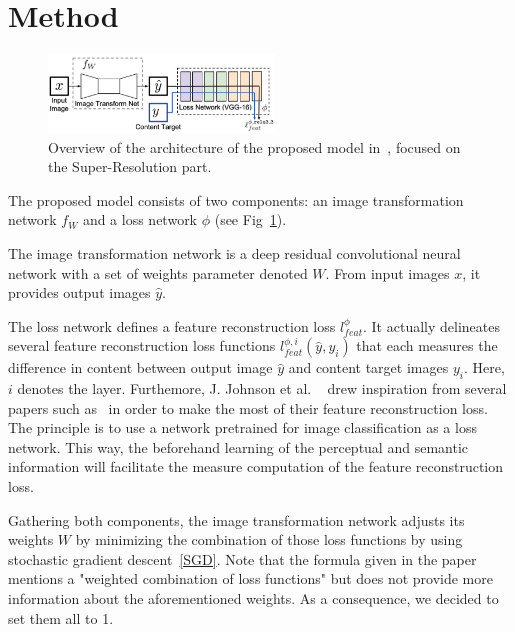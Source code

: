 \documentclass{article}
\begin{document}
{
    \section{Method}
    \label{sec:method}

        \begin{figure}[ht]
            \centering
            \includegraphics[width=6cm]{images/model.png}
            \caption{Overview of the architecture of the proposed model in~\cite{https://doi.org/10.48550/arxiv.1603.08155}, focused on the Super-Resolution part.}
            \label{fig:model}
        \end{figure}


        The proposed model consists of two components: an image transformation network $f_W$ and a loss network $\phi$ (see Fig~\ref{fig:model}). 
        
        The image transformation network is a deep residual convolutional neural network with a set of weights parameter denoted $W$. From input images $x$, it provides output images $\hat y$. 
        
        The loss network defines a feature reconstruction loss $l^\phi_{feat}$. It actually delineates several feature reconstruction loss functions $l^{\phi, i}_{feat}(\hat y, y_i)$ that each measures the difference in content between output image $\hat y$ and content target images $y_i$. Here, $i$ denotes the layer.
        Furthemore, J. Johnson et al. ~\cite{https://doi.org/10.48550/arxiv.1603.08155} drew inspiration from several papers such as~\cite{gatys} in order to make the most of their feature reconstruction loss. The principle is to use a network pretrained for image classification as a loss network. This way, the beforehand learning of the perceptual and semantic information will facilitate the measure computation of the feature reconstruction loss. 

        \bigskip
        
        Gathering both components, the image transformation network adjusts its weights $W$ by minimizing the combination of those loss functions by using stochastic gradient descent~\ref{SGD}. Note that the formula given in the paper~\cite{https://doi.org/10.48550/arxiv.1603.08155} mentions a "weighted combination of loss functions" but does not provide more information about the aforementioned weights. As a consequence, we decided to set them all to 1.

}
\end{document}
